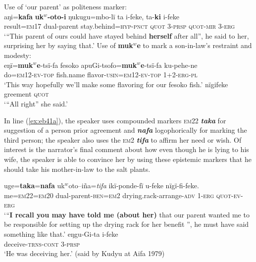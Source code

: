 \documentclass[output=paper]{langsci/langscibook}
\begin{document}
\begin{exe}
\ex \label{ex:eb40}
	\begin{xlist}
	\ex  Use of ‘our parent’ as politeness marker: \label{ex:eb40a}\\
	\gll aŋi=\textbf{kafa} \textbf{uk$^w$-oto-i} ŋukugu=mbo-lï ta i-feke, ta-\textbf{ki} i-feke\\ %
	result=\textsc{em17} dual-parent stay.behind=\textsc{hyp-pnct} \textsc{quot} 3-\textsc{prsp} \textsc{quot-mir} 3-\textsc{erg}\\
	\trans ‘“This parent of ours could have stayed behind \textbf{herself} after all”, he said to her, surprising her by saying that.’
	\ex Use of \textbf{muk$^w$e} to mark a son-in-law’s restraint and modesty: \label{ex:eb40b}\\
	\gll eŋï=\textbf{muk$^w$e}-tsï-fa fesoko apuGi-tsofo=\textbf{muk$^w$e}-tsï-fa ku-pehe-ne\\
	do=\textsc{em12-ev-top} fish.name flavor-\textsc{usin=em12-ev-top} 1+2-\textsc{erg-pl}\\
	\trans `This way hopefully we’ll make some flavoring for our fesoko fish.'
	\ex \label{ex:eb40c}
	 nïgifeke\\
	greement \textsc{quot}\\
	\trans `“All right” she said.'
\end{xlist}
\end{exe}

In line (\ref{ex:eb41a}), the speaker uses compounded markers \textsc{em}22 \textbf{\textit{taka}} for suggestion of a  person prior agreement and \textbf{\textit{nafa}} logophorically for marking the third person;  the speaker also uses the  \textsc{em}2 \textbf{\textit{tifa}} to affirm her need or wish.  
Of interest is the narrator’s final comment about how even though he is lying to his wife,  the speaker is able to convince her by using these epistemic markers that he should take his mother-in-law to the salt plants. 

\begin{exe}
\ex \label{ex:eb41}
	\begin{xlist}
	\ex \label{ex:eb41a}
	\gll uge=\textbf{taka}=\textbf{nafa} uk$^w$oto–iña=\textit{tifa} ikï-ponde-fï u-feke nïgï-fi-feke.\\
	me=\textsc{em22=em20} dual-parent-\textsc{ben=em2} drying.rack-arrange-\textsc{adv} 1-\textsc{erg} \textsc{quot-ev-erg}\\
	\trans `“\textbf{I recall you may have told me (about her)} that our parent wanted me to be responsible for setting up the drying rack for her benefit ”, he must have said something like that.’
	\ex \label{ex:eb41b}
	\gll eŋgu-Gi-ta i-feke\\
	deceive-\textsc{trns-cont} 3-\textsc{prsp}\\
	\trans ‘He was deceiving her.’ (said by Kudyu at Aifa 1979)
\end{xlist}
\end{exe}
\end{document}
